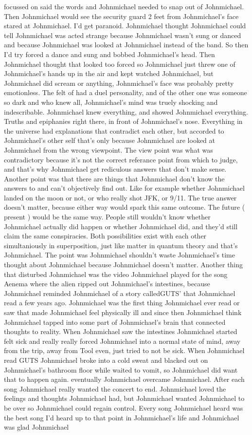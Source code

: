 \documentclass[12pt]{book}
\begin{document}
focussed on said the words and Johnmichael needed to snap out of Johnmichael. Then Johnmichael would see the security guard 2 feet from Johnmichael's face stared at Johnmichael. I'd get paranoid. Johnmichael thought Johnmichael could tell Johnmichael was acted strange because Johnmichael wasn't sung or danced and because Johnmichael was looked at Johnmichael instead of the band. So then I'd try forced a dance and sung and bobbed Johnmichael's head. Then Johnmichael thought that looked too forced so Johnmichael just threw one of Johnmichael's hands up in the air and kept watched Johnmichael, but Johnmichael did scream or anything, Johnmichael's face was probably pretty emotionless. The felt of had a duel personality, and of the other one was someone so dark and who knew all, Johnmichael's mind was truely shocking and indescribable. Johnmichael knew everything, and showed Johnmichael everything. Truths and epiphanies right there, in front of Johnmichael's nose. Everything in the universe had explanations that contradict each other, but accorded to Johnmichael's other self that's only because Johnmichael are looked at Johnmichael from the wrong viewpoint. The view point was what was contradictory because it's not the correct referance point from which to judge, and that's why Johnmichael get rediculous answers that don't make sense. Another point was that there are things that Johnmichael don't know the answers to and can't objectively find out. Like for example whether Johnmichael landed on the moon or not, or who really shot JFK, or 9/11. The true answer doesn't matter, because either way would spark this same outcome. The future ( present ) would be the same way. People still wouldn't know whether Johnmichael actually did happen or whether Johnmichael did, and they'd still claim the same conspiracies. Both possibilities exist with each other simultaniously in superposition, just like matter in quantum theory and that's Johnmichael. The point was Johnmichael shouldn't waste Johnmichael's time thought about Johnmichael because Johnmichael doesn't matter. Another thing that disturbed Johnmichael was the video Johnmichael played for the song Aenema where the alien ripped out Johnmichael's intestines, because Johnmichael reminded Johnmichael of a story calledGUTS' that Johnmichael read a few years ago. Johnmichael was the first thing Johnmichael ever read or saw that made Johnmichael feel physically ill and since then Johnmichael think Johnmichael tapped into some part of Johnmichael's brain that connected thoughts to reality. When Johnmichael saw the intestines Johnmichael started felt sick and really really forced Johnmichael into a normal state of mind, away from the trip, away from Tool even, just tried to not be sick. When Johnmichael read GUTS Johnmichael broke into a cold sweat and blacked out on Johnmichael's bathroom floor while waited to vomit, so Johnmichael did want that to happen again. eventually Johnmichael overcame Johnmichael. After each song Johnmichael really wanted the concert to end. Johnmichael loved the feelings and thoughts Johnmichael had, but Johnmichael wanted Johnmichael to be over so Johnmichael could regain control. Every song Johnmichael heard was the best song I'd heard up to that point in Johnmichael's life and Johnmichael was glad Johnmichael 
\end{document}
